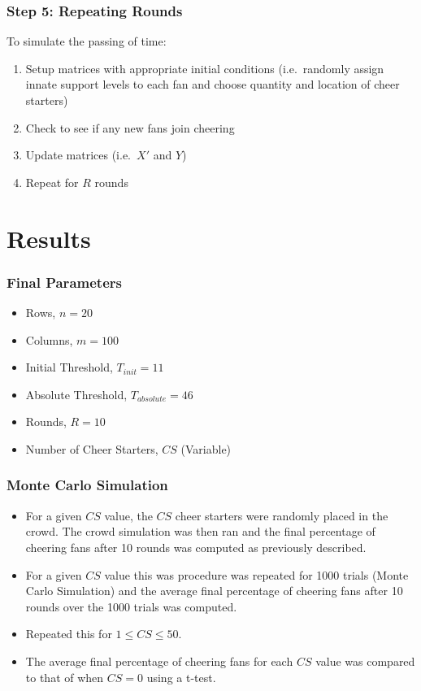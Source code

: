 \documentclass[compress,handout,10pt]{beamer}
\let\olditem\item
\renewcommand{\item}{\setlength{\itemsep}{0.5\baselineskip}\olditem}
\begin{document}
\begin{frame}
\frametitle{Step 5: Repeating Rounds}
To simulate the passing of time:
	\begin {enumerate}
		\item Setup matrices with appropriate initial conditions (i.e.~randomly assign innate support levels to each fan and choose quantity and location of cheer starters)
		\item Check to see if any new fans join cheering
		\item Update matrices (i.e.~$X'$ and $Y$)
		\item Repeat for $R$ rounds
	\end {enumerate}
\end{frame}

\section{Results}

\begin{frame}
	\frametitle{Final Parameters}
	\begin{itemize}
		\item Rows, $n=20$
		\item Columns, $m=100$
		\item Initial Threshold, $T_{init}=11$
		\item Absolute Threshold, $T_{absolute}=46$
		\item Rounds, $R=10$
		\item Number of Cheer Starters, $CS$ (Variable)
	\end{itemize}
\end{frame}

\begin{frame}
	\frametitle{Monte Carlo Simulation}
	\begin{itemize}
		\item For a given $CS$ value, the $CS$ cheer starters were randomly placed in the crowd. The crowd simulation was then ran and the final percentage of cheering fans after 10 rounds was computed as previously described.
		\item For a given $CS$ value this was procedure was repeated for 1000 trials (Monte Carlo Simulation) and the average final percentage of cheering fans after 10 rounds over the 1000 trials was computed. 
		\item Repeated this for $1 \leq CS \leq 50$.
		\item The average final percentage of cheering fans for each $CS$ value was compared to that of when $CS=0$ using a t-test. 
	\end{itemize}
\end{frame}
\end{document}
